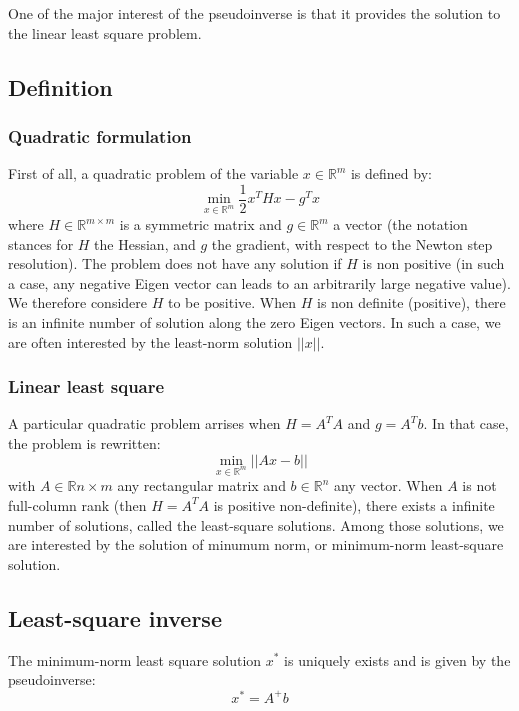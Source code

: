 \documentclass{book}
\begin{document}
One of the major interest of the pseudoinverse is that it provides the solution to the linear least square problem.

\subsection{Definition}

\subsubsection{Quadratic formulation}
First of all, a quadratic problem of the variable $x\in\mathbb{R}^m$ is defined by:
$$ \min_{x\in\mathbb{R}^m} \frac{1}{2} x^T H x - g^T x $$
where $H\in\mathbb{R}^{m\times m}$ is a symmetric matrix and $g\in\mathbb{R}^m$ a vector (the notation stances for $H$ the Hessian, and $g$ the gradient, with respect to the Newton step resolution). The problem does not have any solution if $H$ is non positive (in such a case, any negative Eigen vector can leads to an arbitrarily large negative value). We therefore considere $H$ to be positive. When $H$ is non definite (positive), there is an infinite number of solution along the zero Eigen vectors. In such a case, we are often interested by the least-norm solution $||x||$.

\subsubsection{Linear least square}
A particular quadratic problem arrises when $H=A^TA$ and $g=A^Tb$. In that case, the problem is rewritten:
$$ \min_{x\in\mathbb{R}^m} || A x - b || $$
with $A \in \mathbb{R}{n \times m}$ any rectangular matrix and $b\in\mathbb{R}^n$ any vector. When $A$ is not full-column rank (then $H=A^TA$ is positive non-definite), there exists a infinite number of solutions, called the least-square solutions. Among those solutions, we are interested by the solution of minumum norm, or minimum-norm least-square solution.


\subsection{Least-square inverse}

The minimum-norm least square solution $x^*$ is uniquely exists and is given by the pseudoinverse:
$$ x^* = A^+ b $$
\end{document}
